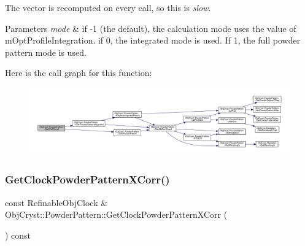 The vector is recomputed on every call, so this is {\itshape slow}. 
\begin{DoxyParams}{Parameters}
{\em mode} & if -\/1 (the default), the calculation mode uses the value of m\+Opt\+Profile\+Integration. if 0, the integrated mode is used. If 1, the full powder pattern mode is used. \\
\hline
\end{DoxyParams}
Here is the call graph for this function\+:
\nopagebreak
\begin{figure}[H]
\begin{center}
\leavevmode
\includegraphics[width=350pt]{class_obj_cryst_1_1_powder_pattern_a9da47365d83b105f22c006bd7145ed23_cgraph}
\end{center}
\end{figure}
\mbox{\label{class_obj_cryst_1_1_powder_pattern_af90dc3f2baa8c13f811ecf119cc49c95}} 
\subsubsection{\texorpdfstring{GetClockPowderPatternXCorr()}{GetClockPowderPatternXCorr()}}
{\footnotesize\ttfamily const Refinable\+Obj\+Clock \& Obj\+Cryst\+::\+Powder\+Pattern\+::\+Get\+Clock\+Powder\+Pattern\+X\+Corr (\begin{DoxyParamCaption}{ }\end{DoxyParamCaption}) const}

